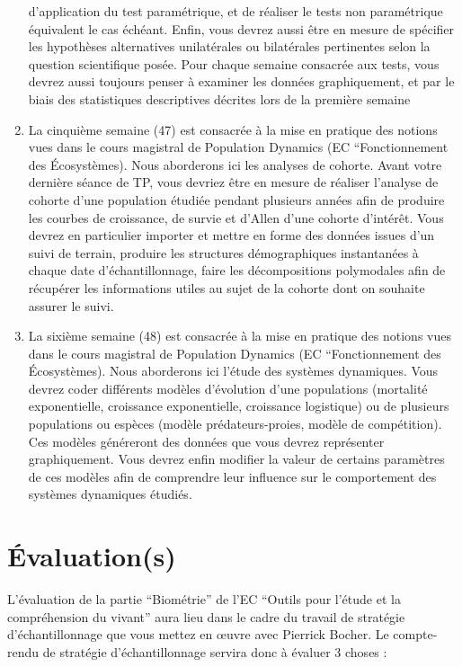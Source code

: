 \documentclass[
  a4paper,
  DIV=11,
  numbers=noendperiod,
  oneside]{scrreprt}
\begin{document}
\begin{enumerate}
  d'application du test paramétrique, et de réaliser le tests non
  paramétrique équivalent le cas échéant. Enfin, vous devrez aussi être
  en mesure de spécifier les hypothèses alternatives unilatérales ou
  bilatérales pertinentes selon la question scientifique posée. Pour
  chaque semaine consacrée aux tests, vous devrez aussi toujours penser
  à examiner les données graphiquement, et par le biais des statistiques
  descriptives décrites lors de la première semaine
\item
  La cinquième semaine (47) est consacrée à la mise en pratique des
  notions vues dans le cours magistral de Population Dynamics (EC
  ``Fonctionnement des Écosystèmes). Nous aborderons ici les analyses de
  cohorte. Avant votre dernière séance de TP, vous devriez être en
  mesure de réaliser l'analyse de cohorte d'une population étudiée
  pendant plusieurs années afin de produire les courbes de croissance,
  de survie et d'Allen d'une cohorte d'intérêt. Vous devrez en
  particulier importer et mettre en forme des données issues d'un suivi
  de terrain, produire les structures démographiques instantanées à
  chaque date d'échantillonnage, faire les décompositions polymodales
  afin de récupérer les informations utiles au sujet de la cohorte dont
  on souhaite assurer le suivi.
\item
  La sixième semaine (48) est consacrée à la mise en pratique des
  notions vues dans le cours magistral de Population Dynamics (EC
  ``Fonctionnement des Écosystèmes). Nous aborderons ici l'étude des
  systèmes dynamiques. Vous devrez coder différents modèles d'évolution
  d'une populations (mortalité exponentielle, croissance exponentielle,
  croissance logistique) ou de plusieurs populations ou espèces (modèle
  prédateurs-proies, modèle de compétition). Ces modèles généreront des
  données que vous devrez représenter graphiquement. Vous devrez enfin
  modifier la valeur de certains paramètres de ces modèles afin de
  comprendre leur influence sur le comportement des systèmes dynamiques
  étudiés.
\end{enumerate}

\hypertarget{uxe9valuations}{%
\section*{Évaluation(s)}\label{uxe9valuations}}

L'évaluation de la partie ``Biométrie'' de l'EC ``Outils pour l'étude et
la compréhension du vivant'' aura lieu dans le cadre du travail de
stratégie d'échantillonnage que vous mettez en œuvre avec Pierrick
Bocher. Le compte-rendu de stratégie d'échantillonnage servira donc à
évaluer 3 choses :
\end{document}
